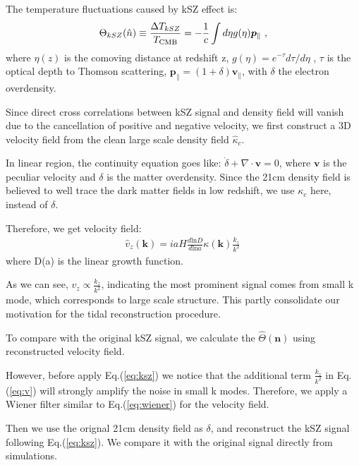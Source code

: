 \indent
The temperature fluctuations caused by kSZ effect is:
\begin{eqnarray}
\label{eq:ksz}
\Theta_{kSZ}(\hat n)\equiv\frac{\Delta T_{kSZ}}{T_{\mathrm{CMB}}}
=-\frac{1}{c}\int d\eta  g(\eta)  \bm{p}_\parallel\ ,
\end{eqnarray}
where $\eta(z)$ is the comoving distance at redshift z, $g(\eta)=e^{-\tau} d\tau/d\eta$ , $\tau$ is the optical depth to Thomson scattering, $\bm{p}_\parallel=(1+\delta)\bm{v}_\parallel$, with $\delta$ the electron overdensity. 

Since direct cross correlations between kSZ signal and density field will vanish due to the cancellation of positive and negative velocity, we first construct a 3D velocity field\cite{Shao11} from the clean large scale density field $\hat\kappa_c$.

In linear region, the continuity equation goes like:
$\dot \delta+\nabla \cdot \bm{v}=0$, 
where $\bm{v}$ is the peculiar velocity and $\delta$ is the matter overdensity. 
Since the 21cm density field is believed to well trace the dark matter fields in low redshift, we use $\kappa_c$ here, instead of $\delta$.

Therefore, we get velocity field:
\begin{eqnarray}
	\label{eq:v}
\hat v_z(\bm{k})=i a H \frac{d\mathrm{ln}D}{d\mathrm{ln}a}\kappa(\bm{k})\frac{k_z}{k^2}\,
\end{eqnarray}
where D(a) is the linear growth function.

As we can see, $v_z \propto \frac{k_z}{k^2}$, indicating the most prominent signal comes from small k mode, which corresponds to large scale structure. This partly consolidate our motivation for the tidal reconstruction procedure.

To compare with the original kSZ signal, we calculate the $\hat\Theta(\bm{n})$ using reconstructed velocity field. 

However, before apply Eq.(\ref{eq:ksz}) we notice that the additional term $\frac{k_z}{k^2}$ in Eq.(\ref{eq:v})
will strongly amplify the noise in small k modes. Therefore, we apply a Wiener filter similar to Eq.(\ref{eq:wiener}) for the velocity field.

Then we use the orignal 21cm density field as $\delta$, 
and reconstruct the kSZ signal following Eq.(\ref{eq:ksz}). 
We compare it with the original signal directly from simulations.


